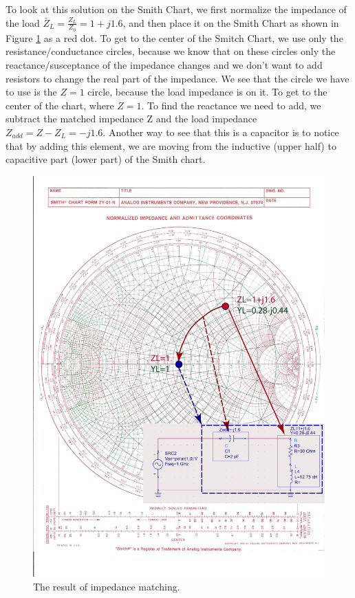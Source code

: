 \documentclass{ximera}
\begin{document}
To look at this solution on the Smith Chart, we first normalize the impedance of the load $\bar{Z}_L=\frac{Z_L}{Z_0}=1+j1.6$, and then place it on the Smith Chart as shown in Figure \ref{fig:SimpleMatch} as a red dot. To get to the center of the Smitch Chart, we use only the resistance/conductance circles, because we know that on these circles only the reactance/susceptance of the impedance changes and we don't want to add resistors to change the real part of the impedance. We see that the circle we have to use is the $Z=1$ circle, because the load impedance  is on it.  To get to the center of the chart, where $Z=1$. To find the reactance we need to add, we subtract  the matched impedance Z and the load impedance $Z_{add}=Z- Z_L=-j1.6$. Another way to see that this is a capacitor is to notice that by adding this element, we are moving from the inductive (upper half) to capacitive part (lower part) of the Smith chart. 

\begin{figure}[htbp]
\begin{center}
\includegraphics[scale=0.4]{../jpg/SimpleMatch-01.jpg}
\end{center}
\caption{The result of impedance matching.}
\label{fig:SimpleMatch}
\end{figure}
\end{document}
